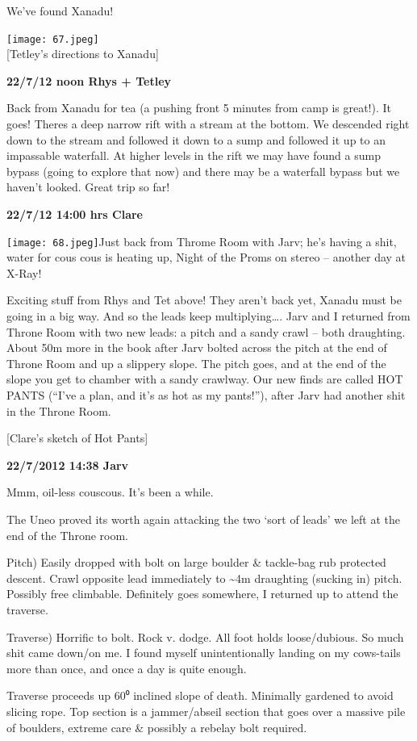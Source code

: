 We've found Xanadu!

\texttt{[image: 67.jpeg]}\\
{[}Tetley's directions to Xanadu{]}

\textbf{22/7/12 noon Rhys + Tetley}

Back from Xanadu for tea (a pushing front 5 minutes from camp is
great!). It goes! Theres a deep narrow rift with a stream at the bottom.
We descended right down to the stream and followed it down to a sump and
followed it up to an impassable waterfall. At higher levels in the rift
we may have found a sump bypass (going to explore that now) and there
may be a waterfall bypass but we haven't looked. Great trip so far!

\textbf{22/7/12 14:00 hrs Clare}

\texttt{[image: 68.jpeg]}Just back from Throme Room with Jarv; he's
having a shit, water for cous cous is heating up, Night of the Proms on
stereo -- another day at X-Ray!

Exciting stuff from Rhys and Tet above! They aren't back yet, Xanadu
must be going in a big way. And so the leads keep multiplying\ldots{}.
Jarv and I returned from Throne Room with two new leads: a pitch and a
sandy crawl -- both draughting. About 50m more in the book after Jarv
bolted across the pitch at the end of Throne Room and up a slippery
slope. The pitch goes, and at the end of the slope you get to chamber
with a sandy crawlway. Our new finds are called HOT PANTS (``I've a
plan, and it's as hot as my pants!''), after Jarv had another shit in
the Throne Room.

{[}Clare's sketch of Hot Pants{]}

\textbf{22/7/2012 14:38 Jarv}

Mmm, oil-less couscous. It's been a while.

The Uneo proved its worth again attacking the two `sort of leads' we
left at the end of the Throne room.

Pitch) Easily dropped with bolt on large boulder \& tackle-bag rub
protected descent. Crawl opposite lead immediately to
\textasciitilde{}4m draughting (sucking in) pitch. Possibly free
climbable. Definitely goes somewhere, I returned up to attend the
traverse.

Traverse) Horrific to bolt. Rock v. dodge. All foot holds loose/dubious.
So much shit came down/on me. I found myself unintentionally landing on
my cows-tails more than once, and once a day is quite enough.

Traverse proceeds up 60⁰ inclined slope of death. Minimally gardened to
avoid slicing rope. Top section is a jammer/abseil section that goes
over a massive pile of boulders, extreme care \& possibly a rebelay bolt
required.

